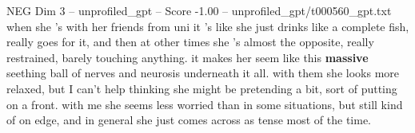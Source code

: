\begin{textsample}{NEG Dim 3 – unprofiled\_gpt – Score -1.00 – unprofiled\_gpt/t000560\_gpt.txt}  \label{ex:f3_neg_010}
when she 's with her friends from uni it 's like she just drinks like a complete fish, really goes for it, and then at other times she 's almost the opposite, really restrained, barely touching anything. it makes her seem like this \textbf{massive} seething ball of nerves and neurosis underneath it all. with them she looks more relaxed, but I can't help thinking she might be pretending a bit, sort of putting on a front. with me she seems less worried than in some situations, but still kind of on edge, and in general she just comes across as tense most of the time.

\end{textsample}
